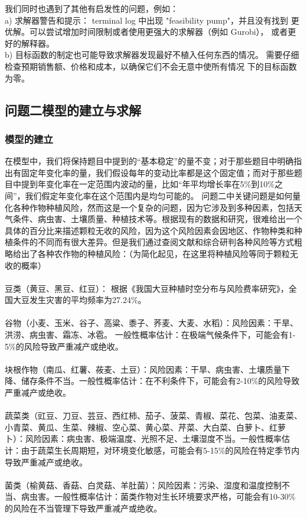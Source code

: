 \documentclass{cumcmthesis}
\begin{document}
我们同时也遇到了其他有启发性的问题，例如：\\
a) 求解器警告和提示： terminal log 中出现 "feasibility pump"，并且没有找到
更优解。可以尝试增加时间限制或者使用更强大的求解器（例如 Gurobi），
或者更好的解释器。 \\
b) 目标函数的制定也可能导致求解器发现最好不植入任何东西的情况。
需要仔细检查预期销售额、价格和成本，以确保它们不会无意中使所有情况
下的目标函数为零。 \\


\subsection{问题二模型的建立与求解}
\subsubsection{模型的建立}
在模型中，我们将保持题目中提到的“基本稳定”的量不变；对于那些题目中明确指出有固定年变化率的量，我们假设每年的变动比率都是这个固定值；而对于那些题目中提到年变化率在一定范围内波动的量，比如“年平均增长率在5\%到10\%之间”，我们假定年变化率在这个范围内是均匀可能的。
问题二中关键问题是如何量化各种作物种植风险，然而这是一个复杂的问题，因为它涉及到多种因素，包括天气条件、病虫害、土壤质量、种植技术等。根据现有的数据和研究，很难给出一个具体的百分比来描述颗粒无收的风险，因为这个风险因素会因地区、作物种类和种植条件的不同而有很大差异。但是我们通过查阅文献和综合研判各种风险等方式粗略给出了各种农作物的种植风险：（为简化起见，在这里将种植风险等同于颗粒无收的概率）\\\\
豆类（黄豆、黑豆、红豆）：
根据《我国大豆种植时空分布与风险费率研究》\cite{ref2}，全国大豆发生灾害的平均频率为27.24\%。 \\\\
谷物（小麦、玉米、谷子、高粱、黍子、荞麦、大麦、水稻）：风险因素：干旱、洪涝、病虫害、霜冻、冰雹。
一般性概率估计：在极端气候条件下，可能会有1-5\%的风险导致严重减产或绝收。\\\\
块根作物（南瓜、红薯、莜麦、土豆）：风险因素：干旱、病虫害、土壤质量下降、储存条件不当。一般性概率估计：在不利条件下，可能会有2-10\%的风险导致严重减产或绝收。\\\\
蔬菜类（豇豆、刀豆、芸豆、西红柿、茄子、菠菜、青椒、菜花、包菜、油麦菜、小青菜、黄瓜、生菜、辣椒、空心菜、黄心菜、芹菜、大白菜、白萝卜、红萝卜）：风险因素：病虫害、极端温度、光照不足、土壤湿度不当。一般性概率估计：由于蔬菜生长周期短，对环境变化敏感，可能会有5-15\%的风险在特定季节内导致严重减产或绝收。\\\\
菌类（榆黄菇、香菇、白灵菇、羊肚菌）：风险因素：污染、湿度和温度控制不当、病虫害。一般性概率估计：菌类作物对生长环境要求严格，可能会有10-30\%的风险在不当管理下导致严重减产或绝收。\\\\
\end{document}
